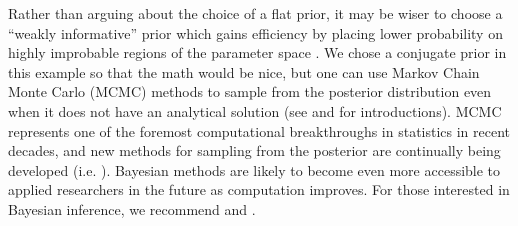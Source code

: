 \documentclass[11pt]{article}
\begin{document}
Rather than arguing about the choice of a flat prior, it may be wiser to choose a ``weakly informative'' prior which gains efficiency by placing lower probability on highly improbable regions of the parameter space \citep{gelman2008}. We chose a conjugate prior in this example so that the math would be nice, but one can use Markov Chain Monte Carlo (MCMC) methods to sample from the posterior distribution even when it does not have an analytical solution (see \citealt{brooks2011} and \citealt{robert2010} for introductions). MCMC represents one of the foremost computational breakthroughs in statistics in recent decades, and new methods for sampling from the posterior are continually being developed (i.e. \citealt{carpenter2017}). Bayesian methods are likely to become even more accessible to applied researchers in the future as computation improves. For those interested in Bayesian inference, we recommend \citet{hoff2009} and \citet{gelman2014}.

\newpage
\begin{small}

\end{small}
\end{document}
